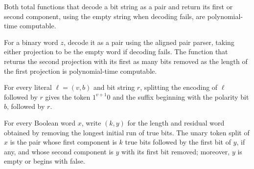 \begin{lemma}
\label{Complexity.sat_pt_fields}
\leanok
{}
Both total functions that decode a bit string as a pair and return its first or second
component, using the empty string when decoding fails, are polynomial-time computable.
\end{lemma}

\begin{lemma}
\label{Complexity.sat_pt_drop}
\leanok
{}
For a binary word $z$, decode it as a pair using the aligned pair parser, taking either
projection to be the empty word if decoding fails. The function that returns the second
projection with its first as many bits removed as the length of the first projection is
polynomial-time computable.
\end{lemma}

\begin{lemma}
\label{Complexity.satToken_literal}
\leanok
{}
For every literal $\ell=(v,b)$ and bit string $r$, splitting the encoding of $\ell$
followed by $r$ gives the token $1^{v+1}0$ and the suffix beginning with the polarity
bit $b$, followed by $r$.
\end{lemma}

\begin{lemma}
\label{Complexity.satToken_shape}
\leanok
{}
For every Boolean word $x$, write $(k,y)$ for the length and residual word obtained by
removing the longest initial run of true bits. The unary token split of $x$ is the pair
whose first component is $k$ true bits followed by the first bit of $y$, if any, and
whose second component is $y$ with its first bit removed; moreover, $y$ is empty or
begins with false.
\end{lemma}

